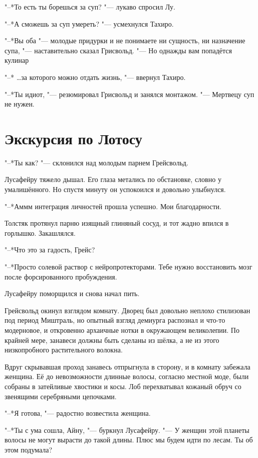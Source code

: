 \documentclass[a4paper,10pt]{book}
\newcommand{\ldotst}{\so{...}\xspace}
\begin{document}
"--*То есть ты борешься за суп? "--- лукаво спросил Лу.

"--*А сможешь за суп умереть? "--- усмехнулся Тахиро.

"--*Вы оба "--- молодые придурки и не понимаете ни сущность, ни назначение 
супа, "--- наставительно сказал Грисвольд. "--- Но однажды вам попадётся 
кулинар\ldotst

"--* \dots за которого можно отдать жизнь, "--- ввернул Тахиро.

"--*Ты идиот, "--- резюмировал Грисвольд и занялся монтажом. "--- Мертвецу суп 
не нужен.

\section{Экскурсия по Лотосу}

"--*Ты как? "--- склонился над молодым парнем Грейсвольд.

Лусафейру тяжело дышал. Его глаза метались по обстановке, словно у 
умалишённого. Но спустя минуту он успокоился и довольно улыбнулся.

"--*Аммм\ldotst интеграция личностей прошла успешно. Мои благодарности.

Толстяк протянул парню изящный глиняный сосуд, и тот жадно впился в горлышко. 
Закашлялся.

"--*Что это за гадость, Грейс?

"--*Просто солевой раствор с нейропротекторами. Тебе нужно восстановить мозг 
после форсированного пробуждения.

Лусафейру поморщился и снова начал пить.

Грейсвольд окинул взглядом комнату. Дворец был довольно неплохо стилизован под 
период Миштраль, но опытный взгляд демиурга распознал и что-то модерновое, и 
откровенно архаичные нотки в окружающем великолепии. По крайней мере, занавеси 
должны быть сделаны из шёлка, а не из этого низкопробного растительного волокна.

Вдруг скрывавшая проход занавесь отпрыгнула в сторону, и в комнату забежала 
женщина. Её до невозможности длинные волосы, согласно местной моде, были 
собраны в затейливые хвостики и косы. Лоб перехватывал кожаный обруч со 
звенящими серебряными цепочками.

"--*Я готова, "--- радостно возвестила женщина.

"--*Ты с ума сошла, Айну, "--- буркнул Лусафейру. "--- У женщин этой планеты 
волосы не могут вырасти до такой длины. Плюс мы будем идти по лесам. Ты об этом 
подумала?
\end{document}
